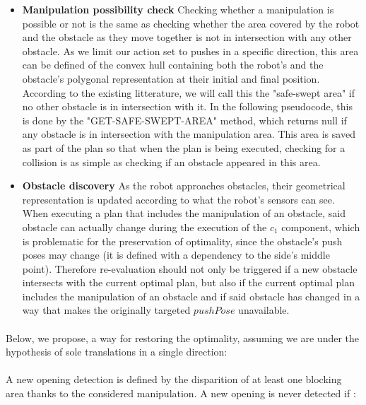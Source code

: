 \begin{itemize}
  \item \textbf{Manipulation possibility check} Checking whether a manipulation is possible or not is the same as checking whether the area covered by the robot and the obstacle as they move together is not in intersection with any other obstacle. As we limit our action set to pushes in a specific direction, this area can be defined of the convex hull containing both the robot's and the obstacle's polygonal representation at their initial and final position. According to the existing litterature, we will call this the "safe-swept area" if no other obstacle is in intersection with it. In the following pseudocode, this is done by the "GET-SAFE-SWEPT-AREA" method, which returns null if any obstacle is in intersection with the manipulation area. This area is saved as part of the plan so that when the plan is being executed, checking for a collision is as simple as checking if an obstacle appeared in this area.
  \item \textbf{Obstacle discovery} As the robot approaches obstacles, their geometrical representation is updated according to what the robot's sensors can see. When executing a plan that includes the manipulation of an obstacle, said obstacle can actually change during the execution of the $c_{1}$ component, which is problematic for the preservation of optimality, since the obstacle's push poses may change (it is defined with a dependency to the side's middle point). Therefore re-evaluation should not only be triggered if a new obstacle intersects with the current optimal plan, but also if the current optimal plan includes the manipulation of an obstacle and if said obstacle has changed in a way that makes the originally targeted $pushPose$ unavailable.
\end{itemize}

\paragraph{}\label{check_opening_solution} Below, we propose, a way for restoring the optimality, assuming we are under the hypothesis of sole translations in a single direction:

\paragraph{} A new opening detection is defined by the disparition of at least one blocking area thanks to the considered manipulation. A new opening is never detected if :

